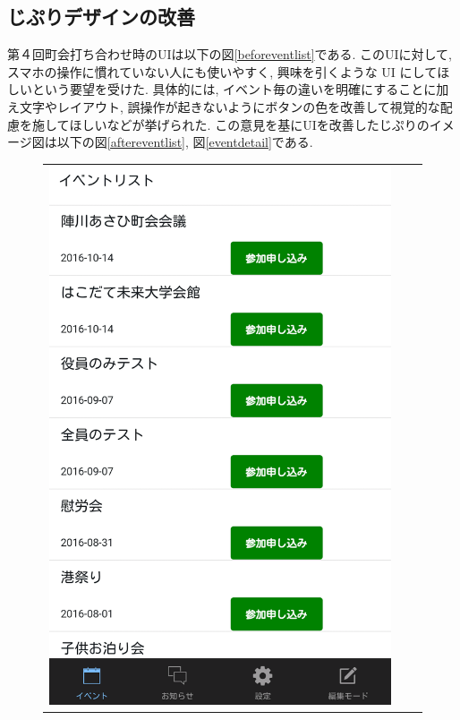 \subsection{じぷりデザインの改善}
第４回町会打ち合わせ時のUIは以下の図\ref{beforeventlist}である.
このUIに対して, スマホの操作に慣れていない人にも使いやすく, 興味を引くような UI にしてほしいという要望を受けた.
具体的には, イベント毎の違いを明確にすることに加え文字やレイアウト, 誤操作が起きないようにボタンの色を改善して視覚的な配慮を施してほしいなどが挙げられた.
この意見を基にUIを改善したじぷりのイメージ図は以下の図\ref{aftereventlist}, 図\ref{eventdetail}である.

\begin{figure}[h]
    \begin{tabular}{ccc}
      \begin{minipage}[t]{0.3\hsize}
        \centering
        \includegraphics[keepaspectratio, scale=0.09]{picture/ui_update/beforupdate.png}

\end{minipage}
\end{tabular}
\end{figure}
